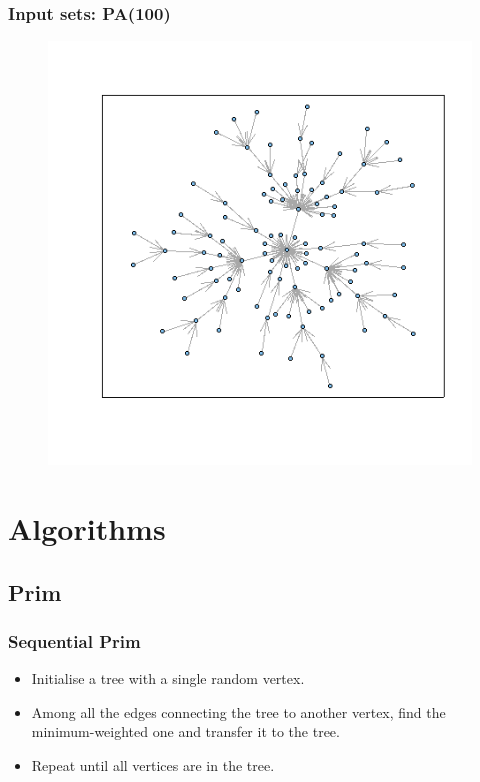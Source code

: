 \documentclass{beamer}
\begin{document}
\begin{frame}
\frametitle{Input sets: PA(100)}
\begin{figure}
 \includegraphics[width=.7\textwidth]{graphPA.png}
\end{figure}
\end{frame}


\section{Algorithms}
\subsection{Prim}
\begin{frame}
\frametitle{Sequential Prim}

    \begin{itemize}
        \item Initialise a tree with a single random vertex.
        \item Among all the edges connecting the tree to another vertex, find the minimum-weighted one and transfer it to the tree.
        \item Repeat until all vertices are in the tree.
    \end{itemize}

\end{frame}
\end{document}
